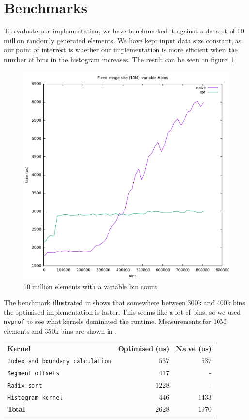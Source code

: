 \documentclass[12pt, a4paper, hidelinks]{article}
\def\fatline{\Xhline{2\arrayrulewidth}}
\renewcommand{\tt}[1]{\texttt{#1}}
\renewcommand{\bf}[1]{\textbf{#1}}
\begin{document}
\section{Benchmarks}
To evaluate our implementation, we have benchmarked it against
a dataset of 10 million randomly generated elements.
We have kept input data size constant,
as our point of interrest is whether our implementation is more
efficient when the number of bins in the histogram increases.
The result can be seen on figure~\ref{fig:graph1}.

\begin{figure}[htpb]
    \centering
    \includegraphics[width=0.6\linewidth]{img/graphs/10M-varbins.pdf}
    \caption{10 million elements with a variable bin count.}
    \label{fig:graph1}
\end{figure}

The benchmark illustrated in 
shows that somewhere between 300k and 400k bins
the optimised implementation is faster.
This seems like a lot of bins,
so we used \tt{nvprof} to see what kernels dominated the runtime.
Measurements for 10M elements and 350k bins are shown in .

\begin{center}
  \begin{tabular}{l|r|r}
    \bf{Kernel} & \bf{Optimised (us)} & \bf{Naive (us)}   \\ \fatline
    \tt{Index and boundary calculation} & $537$  & $537$  \\ \hline
    \tt{Segment offsets}                & $417$  & -      \\ \hline
    \tt{Radix sort}                     & $1228$ & -      \\ \hline
    \tt{Histogram kernel}               & $446$  & $1433$ \\ \fatline
    \bf{Total}                          & $2628$ & $1970$ \\
  \end{tabular}\\
  \label{table:nvprof0}
\end{center}
\end{document}
